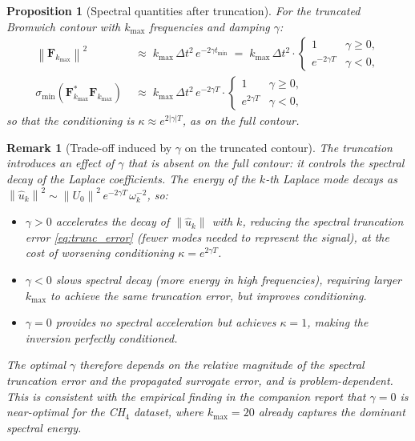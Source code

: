 \documentclass[11pt, a4paper]{article}
\newtheorem{proposition}[theorem]{Proposition}
\newtheorem{remark}[theorem]{Remark}
\newcommand{\norm}[1]{\left\|#1\right\|}
\begin{document}
\begin{proposition}[Spectral quantities after truncation]
  \label{prop:bromwich_truncated}
  For the truncated Bromwich contour with $k_{\max}$ frequencies and
  damping $\gamma$:
  \begin{align}
    \norm{\mathbf{F}_{k_{\max}}}^2
    &\;\approx\; k_{\max}\,\Delta t^2\,e^{-2\gamma t_{\min}}
     \;=\; k_{\max}\,\Delta t^2 \cdot \begin{cases} 1 & \gamma \geq 0, \\
     e^{-2\gamma T} & \gamma < 0, \end{cases}
    \label{eq:F_norm_trunc} \\[6pt]
    \sigma_{\min}(\mathbf{F}_{k_{\max}}^*\mathbf{F}_{k_{\max}})
    &\;\approx\; k_{\max}\,\Delta t^2\,e^{-2\gamma T} \cdot
      \begin{cases} 1 & \gamma \geq 0, \\ e^{2\gamma T} & \gamma < 0,
      \end{cases}
    \label{eq:sigmin_trunc}
  \end{align}
  so that the conditioning is $\kappa \approx e^{2|\gamma|T}$,
  as on the full contour.
\end{proposition}
 
\begin{remark}[Trade-off induced by $\gamma$ on the truncated contour]
  \label{rem:gamma_trunc}
  The truncation introduces an effect of $\gamma$ that is absent on the
  full contour: it controls the \emph{spectral decay} of the Laplace
  coefficients. The energy of the $k$-th Laplace mode decays as
  $\norm{\hat{u}_k}^2 \sim \norm{U_0}^2\,e^{-2\gamma T}\,\omega_k^{-2}$,
  so:
  \begin{itemize}
    \item $\gamma > 0$ accelerates the decay of $\norm{\hat{u}_k}$ with
          $k$, reducing the spectral truncation error \eqref{eq:trunc_error}
          (fewer modes needed to represent the signal), at the cost of
          worsening conditioning $\kappa = e^{2\gamma T}$.
    \item $\gamma < 0$ slows spectral decay (more energy in high
          frequencies), requiring larger $k_{\max}$ to achieve the same
          truncation error, but improves conditioning.
    \item $\gamma = 0$ provides no spectral acceleration but achieves
          $\kappa = 1$, making the inversion perfectly conditioned.
  \end{itemize}
  The optimal $\gamma$ therefore depends on the relative magnitude of
  the spectral truncation error and the propagated surrogate error,
  and is problem-dependent. This is consistent with the empirical finding
  in the companion report that $\gamma = 0$ is near-optimal for the
  CH$_4$ dataset, where $k_{\max} = 20$ already captures the dominant
  spectral energy.
\end{remark}
 
\end{document}

